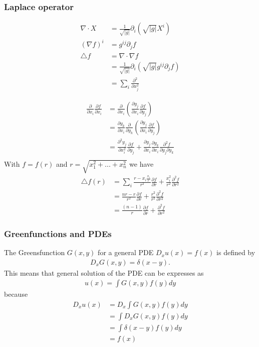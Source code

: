 \documentclass[10pt,a4paper]{article}
\theoremstyle{definition}
\begin{document}
\subsubsection{Laplace operator}
\begin{align}
    \nabla\cdot X&=\frac{1}{\sqrt{|g|}}\partial_i\left(\sqrt{|g|}X^i\right)\\
    (\nabla f)^i&=g^{ij}\partial_jf\\
    \triangle f &= \nabla\cdot\nabla f\\
    &=\frac{1}{\sqrt{|g|}}\partial_i\left(\sqrt{|g|} g^{ij}\partial_jf \right)\\
    &= \sum_i \frac{\partial^2}{\partial x_j^2}
\end{align}

\begin{align}
    \frac{\partial}{\partial x_i}\frac{\partial f}{\partial x_i}
    &=\frac{\partial}{\partial x_i}\left(\frac{\partial y_j}{\partial x_i}\frac{\partial f}{\partial y_j}\right)\\
    &=\frac{\partial y_k}{\partial x_i}\frac{\partial}{\partial y_k}\left(\frac{\partial y_j}{\partial x_i}\frac{\partial f}{\partial y_j}\right)\\
    &=\frac{\partial^2 y_j}{\partial x_i^2}\frac{\partial f}{\partial y_j} + \frac{\partial y_j}{\partial x_i}\frac{\partial y_k}{\partial x_i}\frac{\partial^2 f}{\partial y_j\partial y_k}\\
\end{align}
With $f=f(r)$ and $r=\sqrt{x_1^2+...+x_n^2}$ we have
\begin{align}
    \triangle f(r)
    &=\sum_i \frac{r-x_i \frac{x_i}{r}}{r^2}\frac{\partial f}{\partial r}+\frac{x_i^2}{r^2}\frac{\partial^2 f}{\partial r^2}\\
    &= \frac{nr-r}{r^2}\frac{\partial f}{\partial r}+\frac{r^2}{r^2}\frac{\partial^2 f}{\partial r^2}\\
    &= \frac{(n-1)}{r}\frac{\partial f}{\partial r}+\frac{\partial^2 f}{\partial r^2}
\end{align}



\subsubsection{Greenfunctions and PDEs}
The Greensfunction $G(x,y)$ for a general PDE $D_x u(x) = f(x)$ is defined by
\begin{align}
    D_x G(x,y) = \delta(x-y).
\end{align}
This means that general solution of the PDE can be expresses as
\begin{align}
    u(x)=\int G(x,y)f(y)dy
\end{align}
because
\begin{align}
    D_x u(x)
    &=D_x \int G(x,y)f(y)dy\\
    &=\int D_x G(x,y)f(y)dy\\
    &=\int \delta(x-y) f(y)dy\\
    &=f(x)
\end{align}
\end{document}
